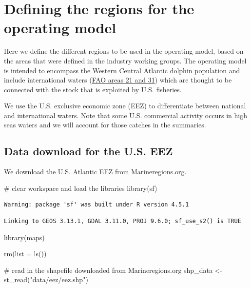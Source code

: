 \documentclass[
]{article}
\newenvironment{Shaded}{\begin{snugshade}}{\end{snugshade}}
\newcommand{\AttributeTok}[1]{\textcolor[rgb]{0.40,0.45,0.13}{#1}}
\newcommand{\CommentTok}[1]{\textcolor[rgb]{0.37,0.37,0.37}{#1}}
\newcommand{\FunctionTok}[1]{\textcolor[rgb]{0.28,0.35,0.67}{#1}}
\newcommand{\NormalTok}[1]{\textcolor[rgb]{0.00,0.23,0.31}{#1}}
\newcommand{\OtherTok}[1]{\textcolor[rgb]{0.00,0.23,0.31}{#1}}
\newcommand{\StringTok}[1]{\textcolor[rgb]{0.13,0.47,0.30}{#1}}
\begin{document}


\section{Defining the regions for the operating
model}\label{defining-the-regions-for-the-operating-model}

Here we define the different regions to be used in the operating model,
based on the areas that were defined in the industry working groups. The
operating model is intended to encompass the Western Central Atlantic
dolphin population and include international waters
(\href{https://www.fao.org/fishery/en/area/search}{FAO areas 21 and 31})
which are thought to be connected with the stock that is exploited by
U.S. fisheries.

We use the U.S. exclusive economic zone (EEZ) to differentiate between
national and international waters. Note that some U.S. commercial
activity occurs in high seas waters and we will account for those
catches in the summaries.

\subsection{Data download for the U.S.
EEZ}\label{data-download-for-the-u.s.-eez}

We download the U.S. Atlantic EEZ from
\href{https://www.marineregions.org/gazetteer.php?p=details&id=8456}{Marineregions.org}.

\begin{Shaded}
\begin{Highlighting}[]
\CommentTok{\# clear workspace and load the libraries}
\FunctionTok{library}\NormalTok{(sf)}
\end{Highlighting}
\end{Shaded}

\begin{verbatim}
Warning: package 'sf' was built under R version 4.5.1
\end{verbatim}

\begin{verbatim}
Linking to GEOS 3.13.1, GDAL 3.11.0, PROJ 9.6.0; sf_use_s2() is TRUE
\end{verbatim}

\begin{Shaded}
\begin{Highlighting}[]
\FunctionTok{library}\NormalTok{(maps)}

\FunctionTok{rm}\NormalTok{(}\AttributeTok{list =} \FunctionTok{ls}\NormalTok{())}

\CommentTok{\# read in the shapefile downloaded from Marineregions.org}
\NormalTok{shp\_data }\OtherTok{\textless{}{-}} \FunctionTok{st\_read}\NormalTok{(}\StringTok{"data/eez/eez.shp"}\NormalTok{)}
\end{Highlighting}
\end{Shaded}
\end{document}
